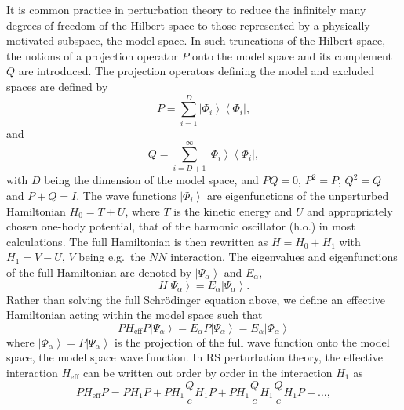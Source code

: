 \documentclass{article}
\begin{document}
It is common practice in perturbation theory to reduce the infinitely
many degrees of freedom of the Hilbert space to those represented
by a physically motivated subspace, the model space.
In such truncations of the Hilbert space, the notions of a projection
operator $P$ onto the model space and its complement $Q$ are
introduced. The projection operators defining the model and excluded
spaces are defined by
\begin{equation}
        P=\sum_{i=1}^{D} \left|\Phi_i\right\rangle
        \left\langle\Phi_i\right |,
\end{equation}
and
\begin{equation}
        Q=\sum_{i=D+1}^{\infty} \left|\Phi_i\right\rangle
        \left\langle\Phi_i\right |,
\end{equation}
with $D$ being the dimension of the model space, and $PQ=0$, $P^2 =P$,
$Q^2 =Q$ and $P+Q=I$. The wave functions $\left|\Phi_i\right\rangle$
are eigenfunctions
of the unperturbed Hamiltonian $H_0 = T+U$, where $T$ is the kinetic
energy and $U$ and appropriately chosen one-body potential, that of the
harmonic oscillator (h.o.) in most calculations. The full Hamiltonian
is then rewritten as $H=H_0 +H_1$ with $H_1=V-U$, $V$ being e.g.\ the
$NN$    interaction. The eigenvalues
and eigenfunctions of the full Hamiltonian are denoted by
$\left|\Psi_{\alpha}\right\rangle$
and $E_{\alpha}$,
\begin{equation}
                H\left|\Psi_{\alpha}\right\rangle=
                E_{\alpha}\left|\Psi_{\alpha}\right\rangle.
\end{equation}
Rather than solving the full Schr\"{o}dinger equation above, we define
an effective Hamiltonian acting within the model space such
that
\begin{equation}
               PH_{\mathrm{eff}}P\left|\Psi_{\alpha}\right\rangle=
               E_{\alpha}P\left|\Psi_{\alpha}\right\rangle=
              E_{\alpha}\left|\Phi_{\alpha}\right\rangle
\end{equation}
where $\left|\Phi_{\alpha}\right\rangle=P\left|\Psi_{\alpha}\right\rangle$
is the projection of the full wave function
onto the model space, the model space wave function.
In RS perturbation theory, the effective interaction
$H_{\mathrm{eff}}$ can be written out order by order in the
interaction $H_1$ as
\begin{equation}
               PH_{\mathrm{eff}}P=PH_1P +PH_1\frac{Q}{e}H_1 P+
               PH_1\frac{Q}{e}H_1 \frac{Q}{e}H_1 P+\dots,
               \label{eq:effint}
\end{equation}
\end{document}
